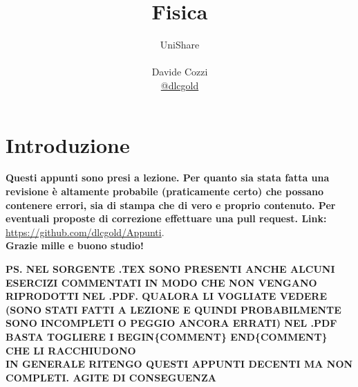 \documentclass[a4paper,12pt, oneside]{book}
\title{Fisica}
\author{UniShare\\\\Davide Cozzi\\\href{https://t.me/dlcgold}{@dlcgold}}
\date{}
\begin{document}
\maketitle


\newtheorem{teorema}{Teorema}
\newtheorem{definizione}{Definizione}
\newtheorem{esempio}{Esempio}
\newtheorem{corollario}{Corollario}
\newtheorem{lemma}{Lemma}
\newtheorem{osservazione}{Osservazione}
\newtheorem{nota}{Nota}
\newtheorem{esercizio}{Esercizio}
\tableofcontents

\renewcommand{\chaptermark}[1]{%
\markboth{\chaptername
\ \thechapter.\ #1}{}}
\renewcommand{\sectionmark}[1]{\markright{\thesection.\ #1}}

\chapter{Introduzione}
\textbf{Questi appunti sono presi a lezione. Per quanto sia stata fatta una revisione è altamente probabile (praticamente certo) che possano contenere errori, sia di stampa che di vero e proprio contenuto. Per eventuali proposte di correzione effettuare una pull request. Link: } \url{https://github.com/dlcgold/Appunti}.\\
\textbf{Grazie mille e buono studio!}

\textbf{PS. NEL SORGENTE .TEX SONO PRESENTI ANCHE ALCUNI ESERCIZI COMMENTATI IN MODO CHE NON VENGANO RIPRODOTTI NEL .PDF. QUALORA LI VOGLIATE VEDERE (SONO STATI FATTI A LEZIONE E QUINDI PROBABILMENTE SONO INCOMPLETI O PEGGIO ANCORA ERRATI) NEL .PDF BASTA TOGLIERE I BEGIN\{COMMENT\} END\{COMMENT\} CHE LI RACCHIUDONO}\\
\textbf{IN GENERALE RITENGO QUESTI APPUNTI DECENTI MA NON COMPLETI. AGITE DI CONSEGUENZA}
\end{document}
